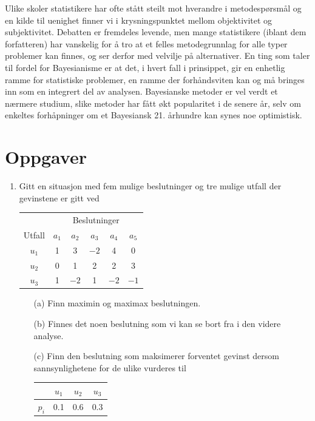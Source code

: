 {{Ulike skoler statistikere har ofte stått steilt mot hverandre i 
metode\-spørs\-mål og en kilde til uenighet finner vi i 
krysningspunktet mellom objektivitet og subjektivitet.  Debatten er
fremdeles levende, men mange statistikere (iblant dem forfatteren) har
vanskelig for å tro at et felles metodegrunnlag for alle typer
problemer kan finnes, og ser derfor med velvilje på alternativer.
En ting som taler til fordel for Bayesianisme er at det, i hvert fall
i prinsippet, gir en enhetlig ramme for statistiske problemer, en
ramme der forhåndsviten kan og må bringes inn som en integrert
del av analysen.  Bayesianske metoder er vel verdt et nærmere
studium, slike metoder har fått økt popularitet i de senere år,
selv om enkeltes forhåpninger om et Bayesiansk 21. århundre kan 
synes noe optimistisk. 



\section{Oppgaver}
\small
\begin{enumerate}
\item Gitt en situasjon med fem mulige beslutninger og tre mulige 
utfall der gevinstene er gitt ved 
\begin{center}
\begin{tabular}{c|ccccc}
           &\multicolumn{5}{c}{Beslutninger} \\
  Utfall   &  $a_1$ & $a_2$ & $a_3$ & $a_4$ & $a_5$ \\ \hline
   $u_1$   &    1   &   3   &  $-2$ &   4   &   0   \\
   $u_2$   &    0   &   1   &   2   &   2   &   3   \\
   $u_3$   &    1   & $-2$  &   1   & $-2$  & $-1$  \\ \hline
\end{tabular}
\end{center}

\begin{itemize}
\item[(a)] Finn maximin og maximax beslutningen.
\item[(b)] Finnes det noen beslutning som vi kan se bort fra i den videre
           analyse.
\item[(c)] Finn den beslutning som maksimerer forventet gevinst dersom
           sannsynlighetene for de ulike vurderes til 
\begin{center}
\begin{tabular}{c|ccc}
             &  $u_1$ & $u_2$ & $u_3$ \\ \hline
      $p_i$  &   0.1  &  0.6  &  0.3 \\ \hline
\end{tabular}
\end{center}
\end{itemize}


\end{enumerate}}}

